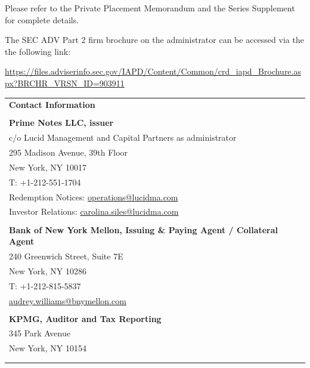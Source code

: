 \documentclass[9pt]{article}
\begin{document}
\noindent Please refer to the Private Placement Memorandum and the Series Supplement for complete details. 

{\color{gray} \noindent The SEC ADV Part 2 firm brochure on the administrator can be accessed via the the following link:

\noindent\underline{https://files.adviserinfo.sec.gov/IAPD/Content/Common/crd\_iapd\_Brochure.aspx?BRCHR\_VRSN\_ID=903911}}

\begin{center}\noindent\begin{tabular}{p{\textwidth}}
\rowcolor{lucid_blue} 
{\color[HTML]{FFFFFF} \textbf{Contact Information}} \\
\rowcolor[HTML]{EFEFEF} 
 \\
\rowcolor[HTML]{EFEFEF} 
\textbf{Prime Notes LLC, issuer} \\
\rowcolor[HTML]{EFEFEF} 
 c/o Lucid Management and Capital Partners as administrator\\
\rowcolor[HTML]{EFEFEF} 
 295 Madison Avenue, 39th Floor\\
\rowcolor[HTML]{EFEFEF} 
 New York, NY 10017\\
\rowcolor[HTML]{EFEFEF} 
 T: +1-212-551-1704\\
\rowcolor[HTML]{EFEFEF} 
 Redemption Notices: \underline{operations@lucidma.com}\\
\rowcolor[HTML]{EFEFEF} 
 Investor Relations: \underline{carolina.siles@lucidma.com}\\
\rowcolor[HTML]{EFEFEF} 
 \\
\rowcolor[HTML]{EFEFEF} 
\textbf{Bank of New York Mellon, Issuing \& Paying Agent / Collateral Agent} \\
\rowcolor[HTML]{EFEFEF} 
 240 Greenwich Street, Suite 7E\\
\rowcolor[HTML]{EFEFEF} 
 New York, NY 10286\\
\rowcolor[HTML]{EFEFEF} 
 T: +1-212-815-5837\\
\rowcolor[HTML]{EFEFEF} 
 \underline{audrey.williams@bnymellon.com}\\
\rowcolor[HTML]{EFEFEF} 
 \\
\rowcolor[HTML]{EFEFEF} 
 \textbf{KPMG, Auditor and Tax Reporting}\\
\rowcolor[HTML]{EFEFEF} 
 345 Park Avenue\\
\rowcolor[HTML]{EFEFEF} 
 New York, NY 10154\\
\rowcolor[HTML]{EFEFEF} 
 \\
\rowcolor[HTML]{EFEFEF} 

\end{tabular}
\end{center}
\end{document}
